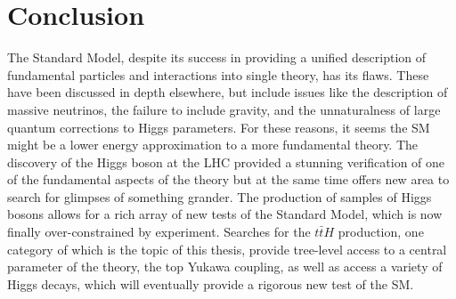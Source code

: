 \section{Conclusion}

The Standard Model, despite its success in providing a unified description of fundamental
particles and interactions into single theory, has its flaws. These have been discussed in 
depth elsewhere, but include issues like the description of massive neutrinos, the failure
to include gravity, and the unnaturalness of large quantum corrections to Higgs parameters.
For these reasons, it seems the SM might be a lower energy approximation to a more fundamental
theory. The discovery of the Higgs boson at the LHC provided a stunning verification of one
of the fundamental aspects of the theory but at the same time offers new area to search for
glimpses of something grander. The production of samples of Higgs bosons
allows for a rich array of new tests of the Standard Model, which is now finally over-constrained by experiment. 
Searches for the $t\bar{t}H$ production, one category of which is the topic
of this thesis, provide tree-level access to a central parameter of the theory, the top Yukawa coupling,
as well as access a variety of Higgs decays, which will eventually provide a rigorous new 
test of the SM. 


